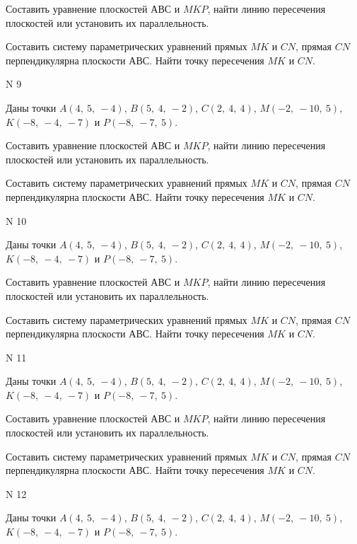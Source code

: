 \documentclass[11pt]{report}
\begin{document}
Составить уравнение плоскостей $АВС$ и $MKP$,
найти линию пересечения плоскостей или установить их параллельность.

Составить систему параметрических уравнений прямых $MK$ и $CN$,
прямая $CN$ перпендикулярна плоскости $АВС$. 
Найти точку пересечения $MK$ и $CN$.



 N 9

Даны точки $A\left( 4, \  5, \  -4\right)$, $B\left( 5, \  4, \  -2\right)$, $C\left( 2, \  4, \  4\right)$, $M\left( -2, \  -10, \  5\right)$, $K\left( -8, \  -4, \  -7\right)$ и $P\left( -8, \  -7, \  5\right)$.


Составить уравнение плоскостей $АВС$ и $MKP$,
найти линию пересечения плоскостей или установить их параллельность.

Составить систему параметрических уравнений прямых $MK$ и $CN$,
прямая $CN$ перпендикулярна плоскости $АВС$. 
Найти точку пересечения $MK$ и $CN$.



 N 10

Даны точки $A\left( 4, \  5, \  -4\right)$, $B\left( 5, \  4, \  -2\right)$, $C\left( 2, \  4, \  4\right)$, $M\left( -2, \  -10, \  5\right)$, $K\left( -8, \  -4, \  -7\right)$ и $P\left( -8, \  -7, \  5\right)$.


Составить уравнение плоскостей $АВС$ и $MKP$,
найти линию пересечения плоскостей или установить их параллельность.

Составить систему параметрических уравнений прямых $MK$ и $CN$,
прямая $CN$ перпендикулярна плоскости $АВС$. 
Найти точку пересечения $MK$ и $CN$.



 N 11

Даны точки $A\left( 4, \  5, \  -4\right)$, $B\left( 5, \  4, \  -2\right)$, $C\left( 2, \  4, \  4\right)$, $M\left( -2, \  -10, \  5\right)$, $K\left( -8, \  -4, \  -7\right)$ и $P\left( -8, \  -7, \  5\right)$.


Составить уравнение плоскостей $АВС$ и $MKP$,
найти линию пересечения плоскостей или установить их параллельность.

Составить систему параметрических уравнений прямых $MK$ и $CN$,
прямая $CN$ перпендикулярна плоскости $АВС$. 
Найти точку пересечения $MK$ и $CN$.



 N 12

Даны точки $A\left( 4, \  5, \  -4\right)$, $B\left( 5, \  4, \  -2\right)$, $C\left( 2, \  4, \  4\right)$, $M\left( -2, \  -10, \  5\right)$, $K\left( -8, \  -4, \  -7\right)$ и $P\left( -8, \  -7, \  5\right)$.
\end{document}
